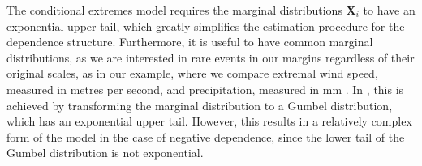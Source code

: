 \documentclass{article}
\numberwithin{equation}{section}
\begin{document}

The conditional extremes model requires the marginal distributions $\bm{X}_i$ to have an exponential upper tail, which greatly simplifies the estimation procedure for the dependence structure.
Furthermore, it is useful to have common marginal distributions, as we are interested in rare events in our margins regardless of their original scales, as in our example, where we compare extremal wind speed, measured in metres per second, and precipitation, measured in mm \cite{Winter2016}.
In \cite{Heffernan2004}, this is achieved by transforming the marginal distribution to a Gumbel distribution, which has an exponential upper tail.
However, this results in a relatively complex form of the model in the case of negative dependence, since the lower tail of the Gumbel distribution is not exponential.
\end{document}
